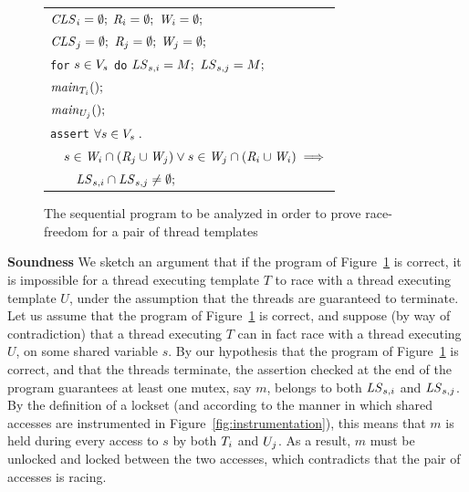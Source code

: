 \begin{figure}
\begin{tabular}{l}
$\mathit{CLS}_{i} = \emptyset;$ $\mathit{R}_{i} = \emptyset;$ $\mathit{W}_{i} = \emptyset;$ \\
$\mathit{CLS}_{j} = \emptyset;$ $\mathit{R}_{j} = \emptyset;$ $\mathit{W}_{j} = \emptyset;$ \\
\texttt{for} $s \in V_s$ \texttt{do} $\mathit{LS}_{s,i} = M;$ $\mathit{LS}_{s,j} = M;$ \medskip
\\

$\mathit{main}_{T_{i}}();$ \\
$\mathit{main}_{U_{j}}();$ \medskip\\

\texttt{assert} $\forall s \in V_s \; .$ \\

$\quad s \in \mathit{W}_{i} \cap (\mathit{R}_{j} \cup \mathit{W}_{j}) \vee s \in \mathit{W}_{j} \cap (\mathit{R}_{i} \cup \mathit{W}_{i}) \implies$ \\

$\quad\quad \mathit{LS}_{s,i} \cap \mathit{LS}_{s,j} \neq \emptyset;$ \\

\end{tabular}
\caption{The sequential program to be analyzed in order to prove race-freedom for a pair of thread templates}
\label{fig:sequentialization}
\end{figure}

\medskip\noindent\textbf{Soundness }
%
We sketch an argument that if the program of Figure~\ref{fig:sequentialization} is correct, it is impossible for a thread executing template $T$ to race with a thread executing template $U$, under the assumption that the threads are guaranteed to terminate. Let us assume that the program of Figure~\ref{fig:sequentialization} is correct, and suppose (by way of contradiction) that a thread executing $T$ can in fact race with a thread executing $U$, on some shared variable $s$.  By our hypothesis that the program of Figure~\ref{fig:sequentialization} is correct, and that the threads terminate, the assertion checked at the end of the program guarantees at least one mutex, say $m$, belongs to both $\mathit{LS}_{s,i}$ and $\mathit{LS}_{s,j}$.  By the definition of a lockset (and according to the manner in which shared accesses are instrumented in Figure~\ref{fig:instrumentation}), this means that $m$ is held during every access to $s$ by both $T_{i}$ and $U_{j}$. As a result, $m$ must be unlocked and locked between the two accesses, which contradicts that the pair of accesses is racing.

